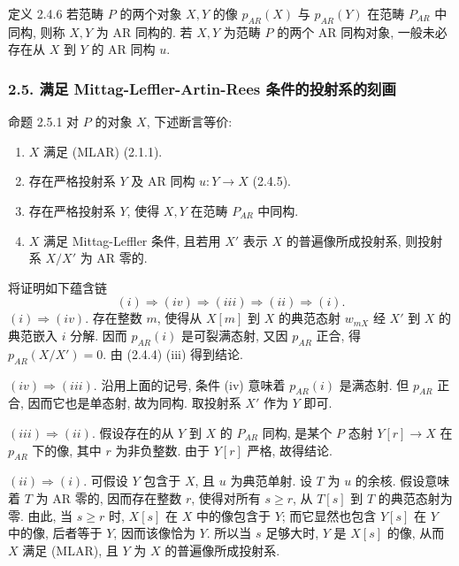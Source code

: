 \begin{statement}{定义 2.4.6}
若范畴 $P$ 的两个对象 $X,Y$ 的像 $p_{AR}(X)$ 与 $p_{AR}(Y)$ 在范畴 $P_{AR}$ 中同构, 则称 $X,Y$ 为 AR 同构的. 若 $X,Y$ 为范畴 $P$ 的两个 AR 同构对象, 一般未必存在从 $X$ 到 $Y$ 的 AR 同构 $u$.
\end{statement}

\subsubsection*{2.5. 满足 Mittag-Leffler-Artin-Rees 条件的投射系的刻画}
\begin{statement}{命题 2.5.1}
对 $P$ 的对象 $X$, 下述断言等价:
\begin{enumerate}[label=(\roman*)]
\item $X$ 满足 (MLAR) (2.1.1).
\item 存在严格投射系 $Y$ 及 AR 同构 $u:Y\to X$ (2.4.5).
\item 存在严格投射系 $Y$, 使得 $X,Y$ 在范畴 $P_{AR}$ 中同构.
\item $X$ 满足 Mittag-Leffler 条件, 且若用 $X'$ 表示 $X$ 的普遍像所成投射系, 则投射系 $X/X'$ 为 AR 零的.
\end{enumerate}
\end{statement}

\begin{prooftext}[证明]
将证明如下蕴含链
\[
(i)\Rightarrow(iv)\Rightarrow(iii)\Rightarrow(ii)\Rightarrow(i).
\]
$(i)\Rightarrow(iv)$. 存在整数 $m$, 使得从 $X[m]$ 到 $X$ 的典范态射 $w_{mX}$ 经 $X'$ 到 $X$ 的典范嵌入 $i$ 分解. 因而 $p_{AR}(i)$ 是可裂满态射, 又因 $p_{AR}$ 正合, 得 $p_{AR}(X/X')=0$. 由 (2.4.4) (iii) 得到结论.

$(iv)\Rightarrow(iii)$. 沿用上面的记号, 条件 (iv) 意味着 $p_{AR}(i)$ 是满态射. 但 $p_{AR}$ 正合, 因而它也是单态射, 故为同构. 取投射系 $X'$ 作为 $Y$ 即可.

$(iii)\Rightarrow(ii)$. 假设存在的从 $Y$ 到 $X$ 的 $P_{AR}$ 同构, 是某个 $P$ 态射 $Y[r]\to X$ 在 $p_{AR}$ 下的像, 其中 $r$ 为非负整数. 由于 $Y[r]$ 严格, 故得结论.

$(ii)\Rightarrow(i)$. 可假设 $Y$ 包含于 $X$, 且 $u$ 为典范单射. 设 $T$ 为 $u$ 的余核. 假设意味着 $T$ 为 AR 零的, 因而存在整数 $r$, 使得对所有 $s\ge r$, 从 $T[s]$ 到 $T$ 的典范态射为零. 由此, 当 $s\ge r$ 时, $X[s]$ 在 $X$ 中的像包含于 $Y$; 而它显然也包含 $Y[s]$ 在 $Y$ 中的像, 后者等于 $Y$, 因而该像恰为 $Y$. 所以当 $s$ 足够大时, $Y$ 是 $X[s]$ 的像, 从而 $X$ 满足 (MLAR), 且 $Y$ 为 $X$ 的普遍像所成投射系.
\end{prooftext}

